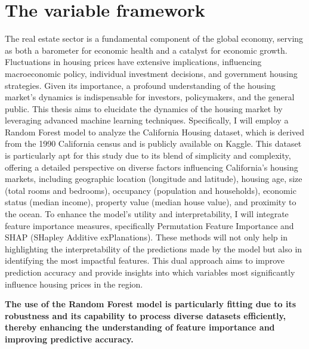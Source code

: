\documentclass[12pt]{article}
\begin{document}
\section{The variable framework}
The real estate sector is a fundamental component of the global economy, serving as both a barometer for economic health and a catalyst for economic growth. Fluctuations in housing prices have extensive implications, influencing macroeconomic policy, individual investment decisions, and government housing strategies. Given its importance, a profound understanding of the housing market's dynamics is indispensable for investors, policymakers, and the general public.
This thesis aims to elucidate the dynamics of the housing market by leveraging advanced machine learning techniques. Specifically, I will employ a Random Forest model to analyze the California Housing dataset, which is derived from the 1990 California census and is publicly available on Kaggle. This dataset is particularly apt for this study due to its blend of simplicity and complexity, offering a detailed perspective on diverse factors influencing California’s housing markets, including geographic location (longitude and latitude), housing age, size (total rooms and bedrooms), occupancy (population and households), economic status (median income), property value (median house value), and proximity to the ocean.
To enhance the model's utility and interpretability, I will integrate feature importance measures, specifically Permutation Feature Importance and SHAP (SHapley Additive exPlanations). 
These methods will not only help in highlighting the interpretability of the predictions made by the model but also in identifying the most impactful features. This dual approach aims to improve prediction accuracy and provide insights into which variables most significantly influence housing prices in the region.









\textbf{The use of the Random Forest model is particularly fitting due to its robustness and its capability to process diverse datasets efficiently, thereby enhancing the understanding of feature importance and improving predictive accuracy.}
\end{document}
